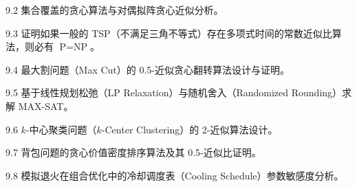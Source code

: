 \begin{exercise}{9.2}
集合覆盖的贪心算法与对偶拟阵贪心近似分析。
\end{exercise}

\begin{exercise}{9.3}
证明如果一般的 TSP（不满足三角不等式）存在多项式时间的常数近似比算法，则必有 $\text{P} = \text{NP}$。
\end{exercise}

\begin{exercise}{9.4}
最大割问题（Max Cut）的 0.5-近似贪心翻转算法设计与证明。
\end{exercise}

\begin{exercise}{9.5}
基于线性规划松弛（LP Relaxation）与随机舍入（Randomized Rounding）求解 MAX-SAT。
\end{exercise}

\begin{exercise}{9.6}
$k$-中心聚类问题（$k$-Center Clustering）的 2-近似算法设计。
\end{exercise}

\begin{exercise}{9.7}
背包问题的贪心价值密度排序算法及其 0.5-近似比证明。
\end{exercise}

\begin{exercise}{9.8}
模拟退火在组合优化中的冷却调度表（Cooling Schedule）参数敏感度分析。
\end{exercise}
